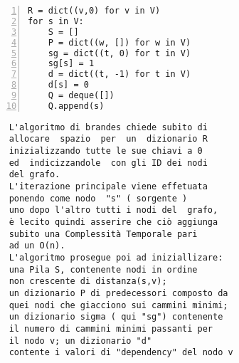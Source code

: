 \begin{minipage}{0.49\linewidth}
\begin{Verbatim}[frame=topline,numbers=left,label=Codice,framesep=3mm]
R = dict((v,0) for v in V)
for s in V:
	S = []
	P = dict((w, []) for w in V)
	sg = dict((t, 0) for t in V)
	sg[s] = 1
	d = dict((t, -1) for t in V)
	d[s] = 0
	Q = deque([])                                   
	Q.append(s)
	\end{Verbatim}
\end{minipage}\hfill
\begin{minipage}{0.49\linewidth}
	\begin{Verbatim}
	L'algoritmo di brandes chiede subito di
	allocare  spazio  per  un  dizionario R 
	inizializzando tutte le sue chiavi a 0 
	ed  indicizzandole  con gli ID dei nodi 
	del grafo. 
	L'iterazione principale viene effetuata
	ponendo come nodo  "s" ( sorgente )
	uno dopo l'altro tutti i nodi del  grafo, 
	è lecito quindi asserire che ciò aggiunga 
	subito una Complessità Temporale pari 
	ad un O(n).
	L'algoritmo prosegue poi ad iniziallizare: 
	una Pila S, contenente nodi in ordine
	non crescente di distanza(s,v);
	un dizionario P di predecessori composto da 
	quei nodi che giacciono sui cammini minimi;
	un dizionario sigma ( qui "sg") contenente
	il numero di cammini minimi passanti per 
	il nodo v; un dizionario "d"
	contente i valori di "dependency" del nodo v
	\end{Verbatim}

\end{minipage}
\newline \newline